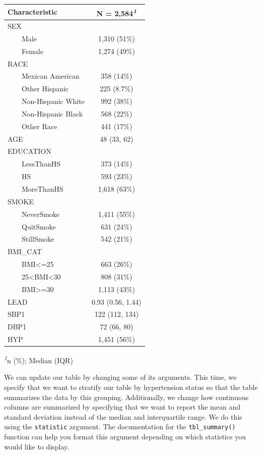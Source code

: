 \documentclass[
  letterpaper,
]{krantz}
\begin{document}
\setlength{\LTpost}{0mm}
\begin{longtable*}{lc}
\toprule
\textbf{Characteristic} & \textbf{N = 2,584}\textsuperscript{\textit{1}} \\ 
\midrule
SEX &  \\ 
    Male & 1,310 (51\%) \\ 
    Female & 1,274 (49\%) \\ 
RACE &  \\ 
    Mexican American & 358 (14\%) \\ 
    Other Hispanic & 225 (8.7\%) \\ 
    Non-Hispanic White & 992 (38\%) \\ 
    Non-Hispanic Black & 568 (22\%) \\ 
    Other Race & 441 (17\%) \\ 
AGE & 48 (33, 62) \\ 
EDUCATION &  \\ 
    LessThanHS & 373 (14\%) \\ 
    HS & 593 (23\%) \\ 
    MoreThanHS & 1,618 (63\%) \\ 
SMOKE &  \\ 
    NeverSmoke & 1,411 (55\%) \\ 
    QuitSmoke & 631 (24\%) \\ 
    StillSmoke & 542 (21\%) \\ 
BMI\_CAT &  \\ 
    BMI<=25 & 663 (26\%) \\ 
    25<BMI<30 & 808 (31\%) \\ 
    BMI>=30 & 1,113 (43\%) \\ 
LEAD & 0.93 (0.56, 1.44) \\ 
SBP1 & 122 (112, 134) \\ 
DBP1 & 72 (66, 80) \\ 
HYP & 1,451 (56\%) \\ 
\bottomrule
\end{longtable*}
\begin{minipage}{\linewidth}
\textsuperscript{\textit{1}}n (\%); Median (IQR)\\
\end{minipage}

We can update our table by changing some of its arguments. This time, we
specify that we want to stratify our table by hypertension status so
that the table summarizes the data by this grouping. Additionally, we
change how continuous columns are summarized by specifying that we want
to report the mean and standard deviation instead of the median and
interquartile range. We do this using the \texttt{statistic} argument.
The documentation for the \texttt{tbl\_summary()} function can help you
format this argument depending on which statistics you would like to
display.
\end{document}
